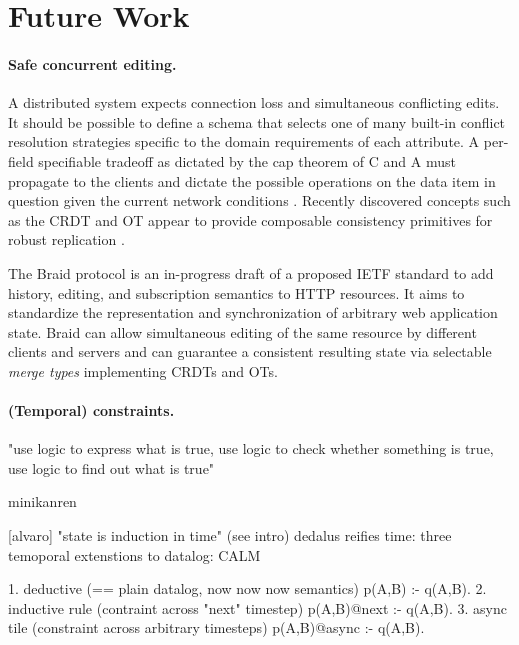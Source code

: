 \cleardoublepage
\section{Future Work}


\paragraph{Safe concurrent editing.}
A distributed system expects connection loss and simultaneous conflicting edits. It should be possible to define a schema that selects one of many built-in conflict resolution strategies specific to the domain requirements of each attribute. A per-field specifiable tradeoff as dictated by the \gls{cap} theorem of C and A must propagate to the clients and dictate the possible operations on the data item in question given the current network conditions \cite{emerick2014api}. Recently discovered concepts such as the \gls{CRDT} and \gls{OT} appear to provide composable consistency primitives for robust replication \cite{weilbach2015replikativ, weilbach2016decoupling}.

The Braid protocol \cite{braid} is an in-progress draft of a proposed \gls{IETF} standard to add history, editing, and subscription semantics to HTTP resources. It aims to standardize the representation and synchronization of arbitrary web application state. Braid can allow simultaneous editing of the same resource by different clients and servers and can guarantee a consistent resulting state via selectable \emph{merge types} implementing CRDTs and OTs.


\paragraph{(Temporal) constraints.}


"use logic to express what is true, use logic to check whether something is true, use logic to find out what is true" \cite{sicp}

minikanren \cite{byrd2010relational}


[alvaro] "state is induction in time" (see intro) dedalus \cite{alvaro2010dedalus} reifies time: three temoporal extenstions to datalog:
\gls{CALM} \cite{alvaro2011consistency}

1. deductive (== plain datalog, now now now semantics) p(A,B) :- q(A,B).
2. inductive rule (contraint across "next" timestep) p(A,B)@next :- q(A,B).
3. async tile (constraint across arbitrary timesteps) p(A,B)@async :- q(A,B).


